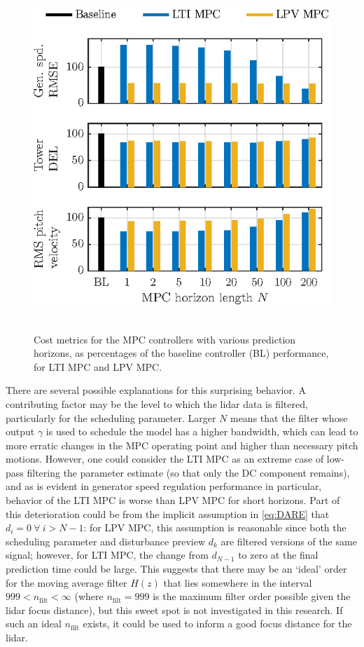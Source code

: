 \documentclass[letterpaper, 10 pt, conference]{ieeeconf}  %
\begin{document}
\begin{figure}[thbp]
	\centering
	\mbox{\includegraphics[trim=0 0 0 -5, clip, scale=1.0]{effectofN.eps}
	}
	\caption{Cost metrics for the MPC controllers with various prediction horizons, as percentages of the baseline controller (BL) performance, for LTI MPC and LPV MPC.}
	\label{fig:bargraph}
\end{figure}

There are several possible explanations for this surprising behavior. A contributing factor may be the level to which the lidar data is filtered, particularly for the scheduling parameter. Larger $N$ means that the filter whose output $\gamma$ is used to schedule the model has a higher bandwidth, which can lead to more erratic changes in the MPC operating point and higher than necessary pitch motions. However, one could consider the LTI MPC as an extreme case of low-pass filtering the parameter estimate (so that only the DC component remains), and as is evident in generator speed regulation performance in particular, behavior of the LTI MPC is worse than LPV MPC for short horizons. Part of this deterioration could be from the implicit assumption in \eqref{eq:DARE} that $d_{i} = 0\:\forall\:i>N-1$: for LPV MPC, this assumption is reasonable since both the scheduling parameter and disturbance preview $d_k$ are filtered versions of the same signal; however, for LTI MPC, the change from $d_{N-1}$ to zero at the final prediction time could be large. This suggests that there may be an `ideal' order for the moving average filter $H(z)$ that lies somewhere in the interval $999 < n_\mathrm{filt} < \infty$ (where $n_\mathrm{filt} = 999$ is the maximum filter order possible given the lidar focus distance), but this sweet spot is not investigated in this research. If such an ideal $n_\mathrm{filt}$ exists, it could be used to inform a good focus distance for the lidar.
\end{document}
